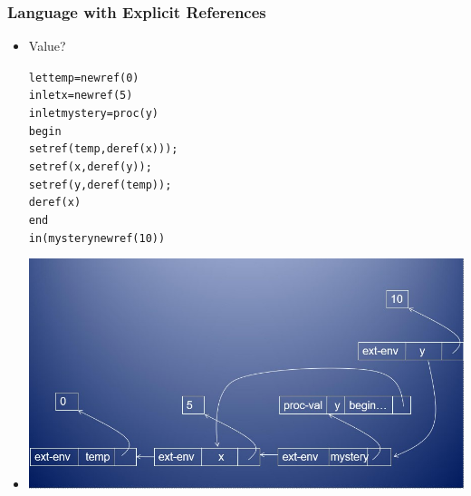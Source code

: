 \documentclass{beamer}
\begin{document}
\begin{frame}[fragile]
\frametitle{Language with Explicit References}
\begin{scriptsize}
\begin{itemize}
\item<1-> Value?
\begin{alltt}
let temp = newref(0)
in  let x = newref(5)
    in  let mystery = proc (y)
                        begin
                          setref(temp, deref(x)));
                          setref(x, deref(y));
                          setref(y, deref(temp));
                          deref(x)
				        end
	    in (mystery newref(10))
\end{alltt}

\item<2->
\begin{center}
\includegraphics[scale=0.5]{mystery1.jpg}
\end{center}

\end{itemize}
\end{scriptsize}
\end{frame}
\end{document}
